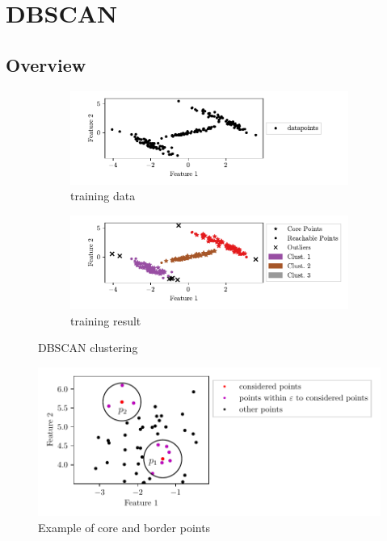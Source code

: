 \section{DBSCAN}
\label{sec:dbscan}

\subsection{Overview}

\begin{figure}[htbp]
    \centering
    \begin{subfigure}{\textwidth}
    \includegraphics[width=\textwidth]{images/DBSCAN/Figure_1.pdf}
    \caption{training data}
    \label{fig:dbscandata}
    \end{subfigure}
    \begin{subfigure}{\textwidth}
    \includegraphics[width=\textwidth]{images/DBSCAN/Figure_2.pdf}
    \caption{training result}
    \label{fig:dbscanresult}
    \end{subfigure}
    \caption{DBSCAN clustering}
    \label{fig:dbscan}
\end{figure}

\begin{figure}
    \centering
    \includegraphics[width=\textwidth]{images/DBSCAN/Figure_3.pdf}
    \caption{Example of core and border points}
    \label{fig:dbscanparams}
\end{figure}

